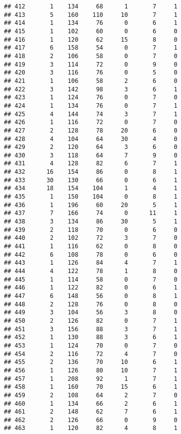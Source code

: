\documentclass[
]{article}
\begin{document}
\begin{verbatim}
## 412       1    134     68      1       7     1
## 413       5    160    110     10       7     1
## 414       1    134     76      0       6     1
## 415       1    102     60      0       6     0
## 416       1    120     62     15       8     0
## 417       6    158     54      0       7     1
## 418       2    106     58      0       7     0
## 419       3    114     72      0       9     0
## 420       3    116     76      0       5     0
## 421       1    106     58      2       6     0
## 422       3    142     98      3       6     1
## 423       1    124     76      0       7     0
## 424       1    134     76      0       7     1
## 425       4    144     74      3       7     1
## 426       1    116     72      0       7     0
## 427       2    128     78     20       6     0
## 428       4    104     64     30       4     0
## 429       2    120     64      3       6     0
## 430       3    118     64      7       9     0
## 431       4    128     82      6       7     1
## 432      16    154     86      0       8     1
## 433      30    130     66      0       6     1
## 434      18    154    104      1       4     1
## 435       1    150    104      0       8     1
## 436       1    196     60     20       5     1
## 437       7    166     74      0      11     1
## 438       3    134     86     30       5     1
## 439       2    118     70      0       6     0
## 440       2    102     72      3       7     0
## 441       1    116     62      0       8     0
## 442       6    108     78      0       6     0
## 443       1    126     84      4       7     1
## 444       4    122     78      1       8     0
## 445       1    114     58      0       7     0
## 446       1    122     82      0       6     1
## 447       6    148     56      0       8     1
## 448       2    128     76      0       8     0
## 449       3    104     56      3       8     0
## 450       2    126     82      0       7     1
## 451       3    156     88      3       7     1
## 452       1    130     88      3       6     1
## 453       1    124     70      0       7     0
## 454       2    116     72      4       7     0
## 455       2    136     70     10       6     1
## 456       1    126     80     10       7     1
## 457       1    208     92      1       7     1
## 458       1    160     70     15       6     1
## 459       2    108     64      2       7     0
## 460       1    134     66      2       6     1
## 461       2    148     62      7       6     1
## 462       2    126     66      0       9     0
## 463       1    120     82      4       8     1

\end{verbatim}
\end{document}
